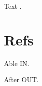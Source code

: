\documentclass{article}
\begin{document}
Text \cite{a}.

\def\foo{OUT}
\section{Refs}
\begin{enumerate}
\def\foo{IN}\small
{} Able \foo.
\end{enumerate}
After \foo.
\end{document}
